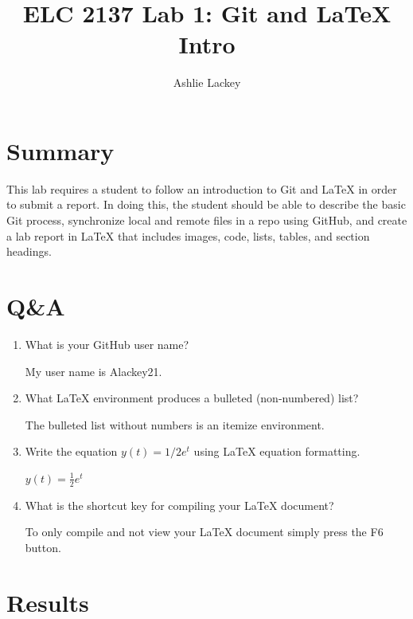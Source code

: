 \documentclass[11pt]{article}
\begin{document}
\title{ELC 2137 Lab 1: Git and LaTeX Intro}
\author{Ashlie Lackey}

\maketitle


\section*{Summary}

This lab requires a student to follow an introduction to Git and LaTeX in order to submit a report. In doing this, the student should be able to describe the basic Git process, synchronize local and remote files in a repo using GitHub, and create a lab report in LaTeX that includes images, code, lists, tables, and section headings.   


\section*{Q\&A}

\begin{enumerate}
\item What is your GitHub user name?
	
	My user name is Alackey21.
\item  What LaTeX environment produces a bulleted (non-numbered) list?
	
	The bulleted list without numbers is an itemize environment.
\item  Write the equation $y(t) = 1/2 e^t$ using LaTeX equation formatting.
	
	$y(t) = \frac{1}{2} e^t$
\item What is the shortcut key for compiling your LaTeX document?

	
	To only compile and not view your LaTeX document simply press the F6 button. 
\end{enumerate}

\section*{Results}
\end{document}
